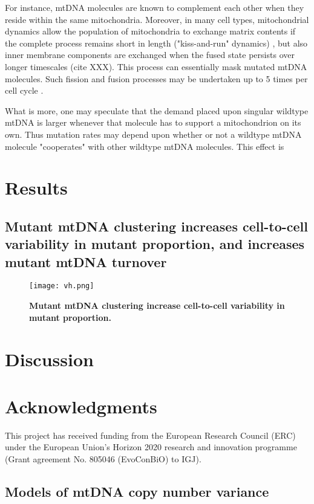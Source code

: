\documentclass[12pt]{article}
\begin{document}
For instance, mtDNA molecules are known to complement each other when they reside within the same mitochondria. Moreover, in many cell types, mitochondrial dynamics allow the population of mitochondria to exchange matrix contents if the complete process remains short in length ("kiss-and-run" dynamics) \citep{logan2010dynamic}, but also inner membrane components are exchanged when the fused state persists over longer timescales (cite XXX). This process can essentially mask mutated mtDNA molecules. Such fission and fusion processes may be undertaken up to 5 times per cell cycle \citep{twig2008mitochondrial}.

What is more, one may speculate that the demand placed upon singular wildtype mtDNA is larger whenever that molecule has to support a mitochondrion on its own. Thus mutation rates may depend upon whether or not a wildtype mtDNA molecule "cooperates" with other wildtype mtDNA molecules. This effect is

\section*{Results}
\subsection*{Mutant mtDNA clustering increases cell-to-cell variability in mutant proportion, and increases mutant mtDNA turnover}

\begin{figure}
\centering
\texttt{[image: vh.png]}
\caption{\textbf{Mutant mtDNA clustering increase cell-to-cell variability in mutant proportion.}}
\end{figure}

\section*{Discussion}

\section*{Acknowledgments}
This project has received funding from the European Research Council (ERC) under the European Union's Horizon 2020 research and innovation programme (Grant agreement No. 805046 (EvoConBiO) to IGJ).



\clearpage
\newpage

\begin{appendices}
\section{Models of mtDNA copy number variance}

\end{appendices}
\end{document}
